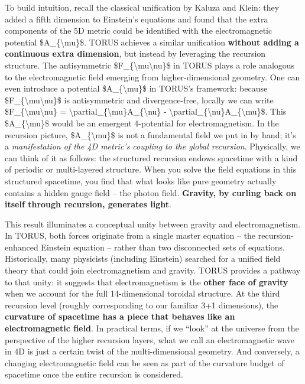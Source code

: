 \documentclass[
]{article}
\begin{document}
To build intuition, recall the classical unification by Kaluza and
Klein: they added a fifth dimension to Einstein's equations and found
that the extra components of the 5D metric could be identified with the
electromagnetic potential \$A\_\{\textbackslash mu\}\$. TORUS achieves a
similar unification \textbf{without adding a continuous extra
dimension}, but instead by leveraging the recursion structure. The
antisymmetric \$F\_\{\textbackslash mu\textbackslash nu\}\$ in TORUS
plays a role analogous to the electromagnetic field emerging from
higher-dimensional geometry\hspace{0pt}. One can even introduce a
potential \$A\_\{\textbackslash mu\}\$ in TORUS's framework: because
\$F\_\{\textbackslash mu\textbackslash nu\}\$ is antisymmetric and
divergence-free, locally we can write
\$F\_\{\textbackslash mu\textbackslash nu\} =
\textbackslash partial\_\{\textbackslash mu\}A\_\{\textbackslash nu\} -
\textbackslash partial\_\{\textbackslash nu\}A\_\{\textbackslash mu\}\$\hspace{0pt}.
This \$A\_\{\textbackslash mu\}\$ would be an emergent 4-potential for
electromagnetism. In the recursion picture, \$A\_\{\textbackslash mu\}\$
is not a fundamental field we put in by hand; it's a \emph{manifestation
of the 4D metric's coupling to the global recursion}. Physically, we can
think of it as follows: the structured recursion endows spacetime with a
kind of periodic or multi-layered structure. When you solve the field
equations in this structured spacetime, you find that what looks like
pure geometry actually contains a hidden gauge field -- the photon
field. \textbf{Gravity, by curling back on itself through recursion,
generates light}.

This result illuminates a conceptual unity between gravity and
electromagnetism. In TORUS, both forces originate from a single master
equation -- the recursion-enhanced Einstein equation -- rather than two
disconnected sets of equations. Historically, many physicists (including
Einstein) searched for a unified field theory that could join
electromagnetism and gravity. TORUS provides a pathway to that unity: it
suggests that electromagnetism is the \textbf{other face of gravity}
when we account for the full 14-dimensional toroidal structure. At the
third recursion level (roughly corresponding to our familiar 3+1
dimensions), the \textbf{curvature of spacetime has a piece that behaves
like an electromagnetic field}\hspace{0pt}. In practical terms, if we
``look'' at the universe from the perspective of the higher recursion
layers, what we call an electromagnetic wave in 4D is just a certain
twist of the multi-dimensional geometry. And conversely, a changing
electromagnetic field can be seen as part of the curvature budget of
spacetime once the entire recursion is considered.
\end{document}
